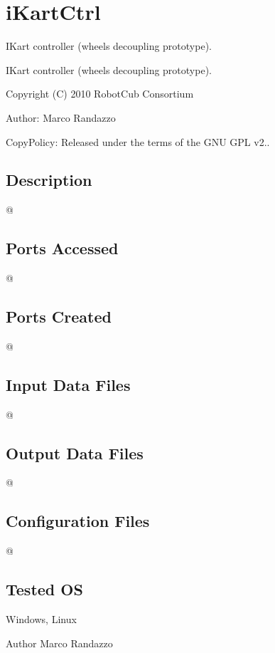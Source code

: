 \section{i\+Kart\+Ctrl}
\label{group__iKartCtrl}


I\+Kart controller (wheels decoupling prototype).  


I\+Kart controller (wheels decoupling prototype). 

Copyright (C) 2010 Robot\+Cub Consortium

Author\+: Marco Randazzo

Copy\+Policy\+: Released under the terms of the G\+N\+U G\+P\+L v2..\hypertarget{group__laserScannerGui_intro_sec}{}\subsection{Description}\label{group__laserScannerGui_intro_sec}
@\hypertarget{group__laserScannerGui_portsa_sec}{}\subsection{Ports Accessed}\label{group__laserScannerGui_portsa_sec}
@\hypertarget{group__laserScannerGui_portsc_sec}{}\subsection{Ports Created}\label{group__laserScannerGui_portsc_sec}
@\hypertarget{group__laserScannerGui_in_files_sec}{}\subsection{Input Data Files}\label{group__laserScannerGui_in_files_sec}
@\hypertarget{group__laserScannerGui_out_data_sec}{}\subsection{Output Data Files}\label{group__laserScannerGui_out_data_sec}
@\hypertarget{group__laserScannerGui_conf_file_sec}{}\subsection{Configuration Files}\label{group__laserScannerGui_conf_file_sec}
@\hypertarget{group__laserScannerGui_tested_os_sec}{}\subsection{Tested O\+S}\label{group__laserScannerGui_tested_os_sec}
Windows, Linux

\begin{DoxyAuthor}{Author}
Marco Randazzo 
\end{DoxyAuthor}
